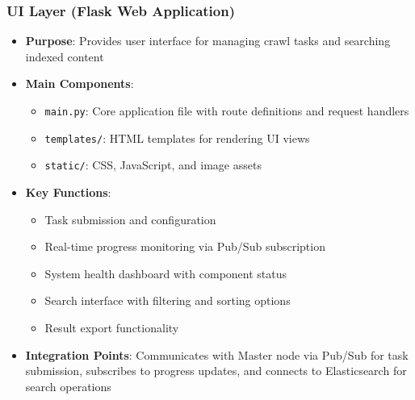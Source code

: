 \documentclass[12pt,a4paper]{report}
\begin{document}
\subsubsection{UI Layer (Flask Web Application)}
\begin{itemize}
    \item \textbf{Purpose}: Provides user interface for managing crawl tasks and searching indexed content
    \item \textbf{Main Components}:
    \begin{itemize}
        \item \texttt{main.py}: Core application file with route definitions and request handlers
        \item \texttt{templates/}: HTML templates for rendering UI views
        \item \texttt{static/}: CSS, JavaScript, and image assets
    \end{itemize}
    \item \textbf{Key Functions}:
    \begin{itemize}
        \item Task submission and configuration
        \item Real-time progress monitoring via Pub/Sub subscription
        \item System health dashboard with component status
        \item Search interface with filtering and sorting options
        \item Result export functionality
    \end{itemize}
    \item \textbf{Integration Points}: Communicates with Master node via Pub/Sub for task submission, subscribes to progress updates, and connects to Elasticsearch for search operations
\end{itemize}
\end{document}
